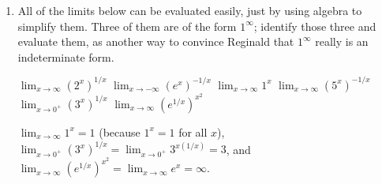 \documentclass{article}
\begin{document}
\begin{enumerate}
\begin{enumerate}
    \begin{solution}
      When we evaluate a $1^\infty$ limit, we're not necessarily raising
      $1$ to a very large power; it's more accurate to think about raising
      a number very close to 1 to a very large power.  For
        example, when you looked numerically at the limit $\displaystyle
        \lim_{h \to 0^+} (1 + h)^{1/h}$ in {{{Problem Set 17}, {{\#6}}}}, plugging
        in tiny values of $h$ involved raising numbers slightly greater
        than 1 to very large powers.  But this can give a great variety
      of results; for example, raising $0.99$ to a huge power can give a
      tiny answer, while raising $1.01$ to a huge power can give a huge
      answer.
    \end{solution}

  \item
    \begin{problem}
      All of the limits below can be evaluated easily, just by using
      algebra to simplify them.  Three of them are of the form $1^\infty$;
      identify those three and evaluate them, as another way to convince
      Reginald that $1^\infty$ really is an indeterminate form.
    \end{problem}

    
      \begin{enumerate}[label=\protect\maybecircle{\Alph*.}]
      \plainitem $\displaystyle \lim_{x \to \infty} \left(2^x
        \right)^{1/x}$
      \plainitem $\displaystyle \lim_{x \to -\infty} \left( e^x
        \right)^{-1/x}$
      \circleitem $\displaystyle \lim_{x \to \infty} 1^x$
      \plainitem $\displaystyle \lim_{x \to \infty} \left( 5^x
        \right)^{-1/x}$ 
      \circleitem $\displaystyle \lim_{x \to 0^+} \left( 3^x
        \right)^{1/x}$
      \circleitem $\displaystyle \lim_{x \to \infty} \left( e^{1/x}
        \right)^{x^2}$
      \end{enumerate}
    

    \begin{solution}
      $\displaystyle \lim_{x \to \infty} 1^x = 1$ (because $1^x = 1$ for
      all $x$), $\displaystyle \lim_{x \to 0^+} \left( 3^x \right)^{1/x} =
      \lim_{x \to 0^+} 3^{x (1/x)} = 3$, and $\displaystyle \lim_{x \to
        \infty} \left( e^{1/x} \right)^{x^2} = \lim_{x \to \infty} e^x =
      \infty$.
    \end{solution}
  \end{enumerate}  



\end{enumerate}
\end{document}
